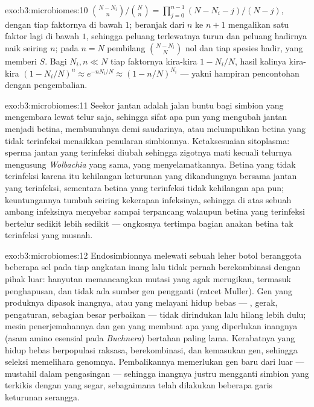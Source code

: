 \begin{solution}{exo:b3:microbiomes:10}
$\binom{N-N_{i}}{n}/\binom{N}{n} = \prod_{j=0}^{n-1}(N - N_{i} - j)/(N -
j)$, dengan tiap faktornya di bawah $1$; beranjak dari $n$ ke $n + 1$ mengalikan
satu faktor lagi di bawah $1$, sehingga peluang terlewatnya turun dan peluang
hadirnya naik seiring $n$; pada $n = N$ pembilang $\binom{N -
N_{i}}{N}$ nol dan tiap spesies hadir, yang memberi $S$. Bagi $N_{i},
n \ll N$ tiap faktornya kira-kira $1 - N_{i}/N$, hasil kalinya kira-kira $(1 -
N_{i}/N)^{n} \approx e^{-nN_{i}/N} \approx (1 - n/N)^{N_{i}}$ --- yakni
hampiran pencontohan dengan pengembalian.
\end{solution}

\begin{solution}{exo:b3:microbiomes:11}
Seekor jantan adalah jalan buntu bagi simbion yang mengembara lewat telur saja,
sehingga sifat apa pun yang mengubah jantan menjadi betina, membunuhnya demi
saudarinya, atau melumpuhkan betina yang tidak terinfeksi menaikkan
penularan simbionnya. Ketaksesuaian sitoplasma: sperma jantan yang terinfeksi
diubah sehingga zigotnya mati kecuali telurnya mengusung
\emph{Wolbachia} yang sama, yang menyelamatkannya. Betina yang tidak terinfeksi
karena itu kehilangan keturunan yang dikandungnya bersama jantan yang terinfeksi,
sementara betina yang terinfeksi tidak kehilangan apa pun; keuntungannya tumbuh
seiring kekerapan infeksinya, sehingga di atas sebuah ambang infeksinya menyebar
sampai terpancang walaupun betina yang terinfeksi bertelur sedikit lebih sedikit
--- ongkosnya tertimpa bagian anakan betina tak terinfeksi yang musnah.
\end{solution}

\begin{solution}{exo:b3:microbiomes:12}
Endosimbionnya melewati sebuah leher botol beranggota beberapa sel pada tiap
angkatan inang lalu tidak pernah berekombinasi dengan pihak luar: hanyutan
memancangkan mutasi yang agak merugikan, termasuk penghapusan, dan tidak ada
sumber gen pengganti (ratcet Muller). Gen yang produknya
dipasok inangnya, atau yang melayani hidup bebas --- , gerak,
pengaturan, sebagian besar perbaikan --- tidak dirindukan lalu hilang lebih
dulu; mesin penerjemahannya dan gen yang membuat apa yang diperlukan inangnya
(asam amino esensial pada \emph{Buchnera}) bertahan paling lama. Kerabatnya yang
hidup bebas berpopulasi raksasa, berekombinasi, dan kemasukan gen, sehingga
seleksi memelihara genomnya. Pembalikannya memerlukan gen baru dari
luar --- mustahil dalam pengasingan --- sehingga inangnya justru mengganti
simbion yang terkikis dengan yang segar, sebagaimana telah dilakukan beberapa
garis keturunan serangga.
\end{solution}

